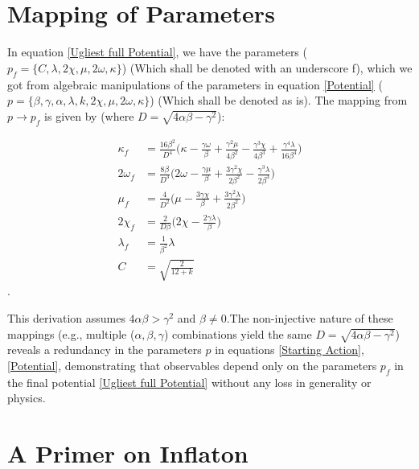 \documentclass[aps,prd,reprint,preprintnumbers,showpacs,floatfix,nofootinbib,superscript address]{revtex4-2}
\begin{document}
\section{Mapping of Parameters} \label{Mapping of Parameters}
In equation \ref{Ugliest full Potential}, we have the parameters ($p_f = \{C,\lambda, 2\chi, \mu, 2\omega,  \kappa \}$) (Which shall be denoted with an underscore f), which we got from algebraic manipulations of the parameters in equation \ref{Potential} ($p = \{\beta,\gamma,\alpha,\lambda, k, 2\chi, \mu, 2\omega,  \kappa \}$) (Which shall be denoted as is). The mapping from $p \rightarrow p_f$ is given by (where $D = \sqrt{4\alpha \beta- \gamma^2}$):

\begin{align}
    \kappa_f &= \frac{16\beta^2}{D^4}\Big(\kappa - \frac{\gamma\omega}{\beta} + \frac{\gamma^2\mu}{4\beta^2} - \frac{\gamma^3\chi}{4\beta^3} +\frac{\gamma^4\lambda}{16\beta^4} \Big)   \nonumber \\
    2\omega_f &= \frac{8\beta}{D^3} \Big(2\omega - \frac{\gamma\mu}{\beta} + \frac{3\gamma^2\chi}{2\beta^2} - \frac{\gamma^3\lambda}{2\beta^3}\Big)   \nonumber \\
    \mu_f &= \frac{4}{D^2} \Big(\mu - \frac{3\gamma\chi}{\beta} + \frac{3\gamma^2\lambda}{2\beta^2} \Big) \nonumber \\
    2\chi_f &= \frac{2}{D\beta} \Big(2\chi - \frac{2\gamma\lambda}{\beta}\Big) \nonumber \\
    \lambda_f &= \frac{1}{\beta^2}\lambda \nonumber \\
    C &= \sqrt{\frac{2}{12+k}}
\end{align}.

This derivation assumes $4\alpha\beta > \gamma^2$ and $\beta \neq 0. $The non-injective nature of these mappings (e.g., multiple ($\alpha,\beta,\gamma$) combinations yield the same $D = \sqrt{4\alpha\beta - \gamma^2}$) reveals a redundancy in the parameters $p$ in equations \ref{Starting Action}, \ref{Potential}, demonstrating that observables depend only on the parameters $p_f$ in the final potential \ref{Ugliest full Potential} without any loss in generality or physics. 


\section{A Primer on Inflaton}\label{The need for Inflation}
\end{document}
